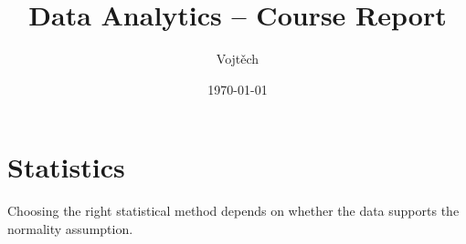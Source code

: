 \documentclass{article}
\title{Data Analytics -- Course Report}   %
\author{Vojtěch}                          %
\date{\today}                             %
\begin{document}
	
	\maketitle
	
	\clearpage
	
	\tableofcontents
	
	\clearpage
	
	\section{Statistics}
	
	Choosing the right statistical method depends on whether the data
	supports the normality assumption.
	
	
	
		
\end{document}
